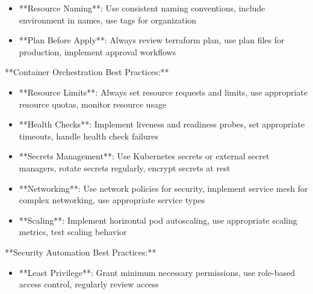 \documentclass[11pt,a4paper]{article}
\begin{document}
\begin{itemize}
\item **Resource Naming**: Use consistent naming conventions, include environment in names, use tags for organization
\end{itemize}

\begin{itemize}
\item **Plan Before Apply**: Always review terraform plan, use plan files for production, implement approval workflows
\end{itemize}

**Container Orchestration Best Practices:**

\begin{itemize}
\item **Resource Limits**: Always set resource requests and limits, use appropriate resource quotas, monitor resource usage
\end{itemize}

\begin{itemize}
\item **Health Checks**: Implement liveness and readiness probes, set appropriate timeouts, handle health check failures
\end{itemize}

\begin{itemize}
\item **Secrets Management**: Use Kubernetes secrets or external secret managers, rotate secrets regularly, encrypt secrets at rest
\end{itemize}

\begin{itemize}
\item **Networking**: Use network policies for security, implement service mesh for complex networking, use appropriate service types
\end{itemize}

\begin{itemize}
\item **Scaling**: Implement horizontal pod autoscaling, use appropriate scaling metrics, test scaling behavior
\end{itemize}

**Security Automation Best Practices:**

\begin{itemize}
\item **Least Privilege**: Grant minimum necessary permissions, use role-based access control, regularly review access
\end{itemize}
\end{document}
